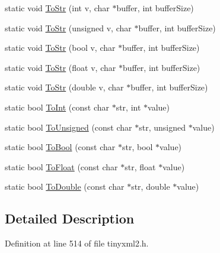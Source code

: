 \begin{DoxyCompactItemize}
\item 
static void \hyperlink{classtinyxml2_1_1_x_m_l_util_a3cd6c703d49b9d51bdf0f4ff6aa021c7}{To\+Str} (int v, char $\ast$buffer, int buffer\+Size)
\item 
static void \hyperlink{classtinyxml2_1_1_x_m_l_util_ac00c2e52c1c36dab3ff41d86a9bf60f9}{To\+Str} (unsigned v, char $\ast$buffer, int buffer\+Size)
\item 
static void \hyperlink{classtinyxml2_1_1_x_m_l_util_adba0718527ae9e80f663a71ea325cb11}{To\+Str} (bool v, char $\ast$buffer, int buffer\+Size)
\item 
static void \hyperlink{classtinyxml2_1_1_x_m_l_util_a8957ad44fee5fa02ba52d73aad4d0a31}{To\+Str} (float v, char $\ast$buffer, int buffer\+Size)
\item 
static void \hyperlink{classtinyxml2_1_1_x_m_l_util_a1cd141e50980fcddd6bf9af5de4b1db7}{To\+Str} (double v, char $\ast$buffer, int buffer\+Size)
\item 
static bool \hyperlink{classtinyxml2_1_1_x_m_l_util_ad4df4023d11ee3fca9689c49b9707323}{To\+Int} (const char $\ast$str, int $\ast$value)
\item 
static bool \hyperlink{classtinyxml2_1_1_x_m_l_util_a210c8637d5eb4ce3d4625294af0efc2f}{To\+Unsigned} (const char $\ast$str, unsigned $\ast$value)
\item 
static bool \hyperlink{classtinyxml2_1_1_x_m_l_util_ae5b03e0a1ca5d42052a7ac540f7aa12a}{To\+Bool} (const char $\ast$str, bool $\ast$value)
\item 
static bool \hyperlink{classtinyxml2_1_1_x_m_l_util_a399e71edb5f29d61ea81d91ee0332bb9}{To\+Float} (const char $\ast$str, float $\ast$value)
\item 
static bool \hyperlink{classtinyxml2_1_1_x_m_l_util_ad8f75ac140fb19c1c6e164a957c4cd53}{To\+Double} (const char $\ast$str, double $\ast$value)
\end{DoxyCompactItemize}


\subsection{Detailed Description}


Definition at line 514 of file tinyxml2.\+h.



